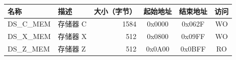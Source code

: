 \begin{longtable}{ | p{3cm} | p{3cm} | r | c | c | c | }
\hline
\rowcolor{lightgray}
名称 & 描述 &  大小（字节） & 起始地址 & 结束地址 & 访问 \\ \hline
{DS\_C\_MEM}\label{DSCMEM}  & 存储器 C  & 1584  & 0x0000 & 0x062F & WO \\ \hline
{DS\_X\_MEM}\label{DSXMEM}  & 存储器 X  & 512  & 0x0800 & 0x09FF & WO \\ \hline
{DS\_Z\_MEM}\label{DSZMEM}  & 存储器 Z  & 512  & 0x0A00 & 0x0BFF & RO \\ \hline
\end{longtable}

